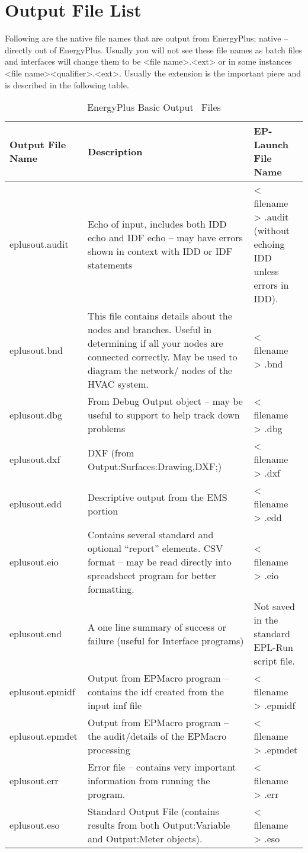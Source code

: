 \section{Output File List}\label{output-file-list}

Following are the native file names that are output from EnergyPlus; native -- directly out of EnergyPlus. Usually you will not see these file names as batch files and interfaces will change them to be \textless{}file name\textgreater{}.\textless{}ext\textgreater{} or in some instances \textless{}file name\textgreater{}\textless{}qualifier\textgreater{}.\textless{}ext\textgreater{}. Usually the extension is the important piece and is described in the following table.

\begin{longtable}[c]{p{1.5in}p{3.0in}p{1.5in}}
\caption{EnergyPlus Basic Output  Files \protect \label{table:energyplus-basic-output-files}}\\
\toprule 
Output File Name & Description & EP-Launch File Name \tabularnewline \midrule
\endhead
eplusout.audit & Echo of input, includes both IDD echo and IDF echo – may have errors shown in context with IDD or IDF statements & < filename > .audit (without echoing IDD unless errors in IDD). \tabularnewline
eplusout.bnd & This file contains details about the nodes and branches. Useful in determining if all your nodes are connected correctly. May be used to diagram the network/ nodes of the HVAC system. & < filename > .bnd \tabularnewline
eplusout.dbg & From Debug Output object – may be useful to support to help track down problems & < filename > .dbg \tabularnewline
eplusout.dxf & DXF (from Output:Surfaces:Drawing,DXF;) & < filename > .dxf \tabularnewline
eplusout.edd & Descriptive output from the EMS portion & < filename > .edd \tabularnewline
eplusout.eio & Contains several standard and optional “report” elements. CSV format – may be read directly into spreadsheet program for better formatting. & < filename > .eio \tabularnewline
eplusout.end & A one line summary of success or failure (useful for Interface programs) & Not saved in the standard EPL-Run script file. \tabularnewline
eplusout.epmidf & Output from EPMacro program – contains the idf created from the input imf file & < filename > .epmidf \tabularnewline
eplusout.epmdet & Output from EPMacro program – the audit/details of the EPMacro processing & < filename > .epmdet \tabularnewline
eplusout.err & Error file – contains very important information from running the program. & < filename > .err \tabularnewline
eplusout.eso & Standard Output File (contains results from both Output:Variable and Output:Meter objects). & < filename > .eso \tabularnewline

\end{longtable}

